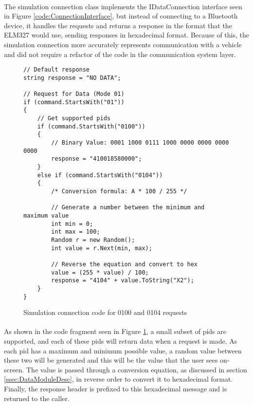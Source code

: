 {{		\paragraph{}{
		The simulation connection class implements the IDataConnection interface seen in Figure \ref{code:ConnectionInterface}, but instead of connecting to a Bluetooth device, it handles the requests and returns a response in the format that the ELM327 would use, sending responses in hexadecimal format. Because of this, the simulation connection more accurately represents communication with a vehicle and did not require a refactor of the code in the communication system layer.
		}	
		\begin{figure}[h]
			\begin{lstlisting}
// Default response
string response = "NO DATA";

// Request for Data (Mode 01)
if (command.StartsWith("01"))
{
	// Get supported pids
	if (command.StartsWith("0100"))
    {
		// Binary Value: 0001 1000 0111 1000 0000 0000 0000 0000
		response = "410018580000";
	}
    else if (command.StartsWith("0104"))
	{
    	/* Conversion formula: A * 100 / 255 */
    	
    	// Generate a number between the minimum and maximum value
        int min = 0;
		int max = 100;
        Random r = new Random();
		int value = r.Next(min, max);

		// Reverse the equation and convert to hex
        value = (255 * value) / 100;
		response = "4104" + value.ToString("X2");
	}
}
			\end{lstlisting}
			\caption{Simulation connection code for 0100 and 0104 requests}
			\label{code:SimConnectionData}
		\end{figure}

		\paragraph{}{
		As shown in the code fragment seen  in Figure \ref{code:SimConnectionData}, a small subset of pids are supported, and each of these pids will return data when a request is made. As each pid has a maximum and minimum possible value, a random value between these two will be generated and this will be the value that the user sees on-screen. The value  is passed through a conversion equation, as discussed in section \ref{ssec:DataModuleDesc}, in reverse order to convert it to hexadecimal format. Finally, the response header is prefixed to this hexadecimal message and is returned to the caller.
		}
}}
